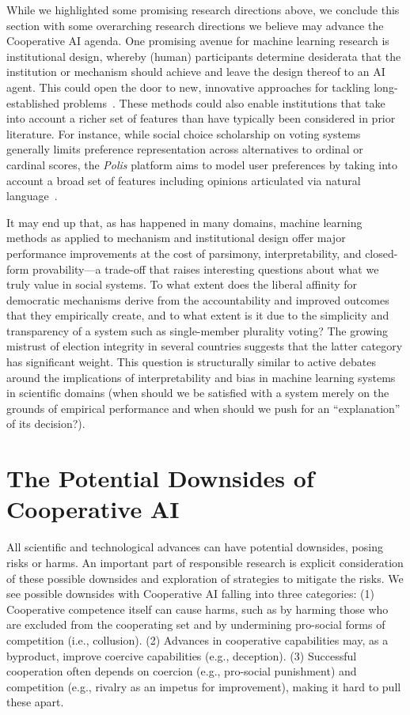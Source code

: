 \documentclass[11pt, a4paper, logo, onecolumn, nonumbering]{deepmind}
\begin{document}
While we highlighted some promising research directions above, we conclude this section with some overarching research directions we believe may advance the Cooperative AI agenda.
One promising avenue for machine learning research is institutional design, whereby (human) participants determine desiderata that the institution or mechanism should achieve and leave  the design thereof to an AI agent. This could open the door to new, innovative approaches for tackling long-established problems~\cite{zheng2020ai}. These methods could also enable institutions that take into account a richer set of features than have typically been considered in prior literature. For instance, while social choice scholarship on voting systems generally limits preference representation across alternatives to ordinal or cardinal scores, the \emph{Polis} platform aims to model user preferences by taking into account a broad set of features including opinions articulated via natural language~\cite{polis}.

It may end up that, as has happened in many domains, machine learning methods as applied to mechanism and institutional design offer major performance improvements at the cost of parsimony, interpretability, and closed-form provability---a trade-off that raises interesting  questions about what we truly value in social systems. To what extent does the liberal affinity for democratic mechanisms derive from the accountability and improved outcomes that they empirically create, and to what extent is it due to the simplicity and transparency of a system such as single-member plurality voting? The growing mistrust of election integrity in several countries suggests that the latter category has significant weight. This question is structurally similar to active debates around the implications of interpretability and bias in machine learning systems in scientific domains (when should we be satisfied with a system merely on the grounds of empirical performance and when should we push for an ``explanation'' of its decision?).






\section{The Potential Downsides of Cooperative AI}
\label{section:downsides}



All scientific and technological advances can have potential downsides, posing risks or harms. An important part of responsible research is explicit consideration of these possible downsides and exploration of strategies to mitigate the risks. We see possible downsides with Cooperative AI falling into three categories: (1) Cooperative competence itself can cause harms, such as by harming those who are excluded from the cooperating set and by undermining pro-social forms of competition (i.e., collusion). 
(2) Advances in cooperative capabilities may, as a byproduct, improve coercive capabilities (e.g., deception). 
(3) Successful cooperation often depends on coercion (e.g., pro-social punishment) and competition (e.g., rivalry as an impetus for improvement), making it hard to pull these apart. 
\end{document}
